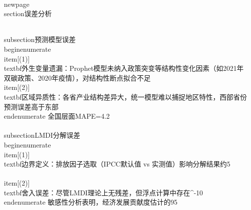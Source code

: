 \\newpage
\\section{误差分析}

\\subsection{预测模型误差}
\\begin{enumerate}
    \\item[(1)] \\textbf{外生变量遗漏}：Prophet模型未纳入政策突变等结构性变化因素（如2021年双碳政策、2020年疫情），对结构性断点拟合不足
    \\item[(2)] \\textbf{区域异质性}：各省产业结构差异大，统一模型难以捕捉地区特性，西部省份预测误差高于东部
\\end{enumerate}
全国层面MAPE=4.2\\%

\\subsection{LMDI分解误差}
\\begin{enumerate}
    \\item[(1)] \\textbf{边界定义}：排放因子选取（IPCC默认值 vs 实测值）影响分解结果约5\\%
    \\item[(2)] \\textbf{舍入误差}：尽管LMDI理论上无残差，但浮点计算中存在^{-10}
\\end{enumerate}
敏感性分析表明，经济发展贡献度估计的95\\%
